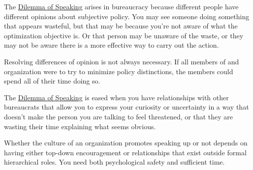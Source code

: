 The \hyperref[table:dilemma-personal-speak-up-or-hold-back]{Dilemma of Speaking} arises in bureaucracy because different people have different opinions about subjective policy. You may see someone doing something that appears wasteful, but that may be because you're not aware of what the optimization objective is. Or that person may be unaware of the waste, or they may not be aware there is a more effective way to carry out the action. 

Resolving differences of opinion is not always necessary. If all members of and organization were to try to minimize policy distinctions, the members could spend all of their time doing so. 

The \hyperref[table:dilemma-personal-speak-up-or-hold-back]{Dilemma of Speaking} is eased when you have relationships with other bureaucrats that allow you to express your curiosity or uncertainty in a way that doesn't make the person you are talking to feel threatened, or that they are wasting their time explaining what seems obvious. 

Whether the culture of an organization promotes speaking up or not depends on having either top-down encouragement or relationships that exist outside formal hierarchical roles. You need both psychological safety and sufficient time. 
  
